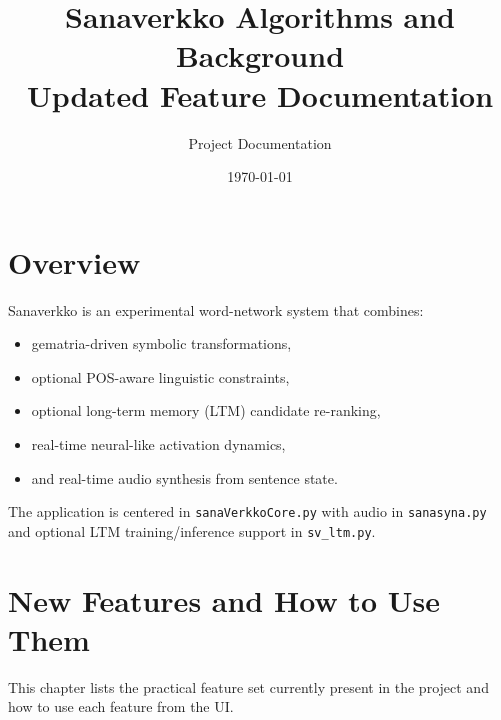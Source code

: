 \documentclass[11pt,a4paper]{report}
\title{Sanaverkko Algorithms and Background \\ \large Updated Feature Documentation}
\author{Project Documentation}
\date{\today}
\begin{document}
\maketitle
\tableofcontents

\chapter{Overview}
Sanaverkko is an experimental word-network system that combines:
\begin{itemize}
  \item gematria-driven symbolic transformations,
  \item optional POS-aware linguistic constraints,
  \item optional long-term memory (LTM) candidate re-ranking,
  \item real-time neural-like activation dynamics,
  \item and real-time audio synthesis from sentence state.
\end{itemize}

The application is centered in \texttt{sanaVerkkoCore.py} with audio in \texttt{sanasyna.py} and optional LTM training/inference support in \texttt{sv\_ltm.py}.

\chapter{New Features and How to Use Them}
This chapter lists the practical feature set currently present in the project and how to use each feature from the UI.
\end{document}
